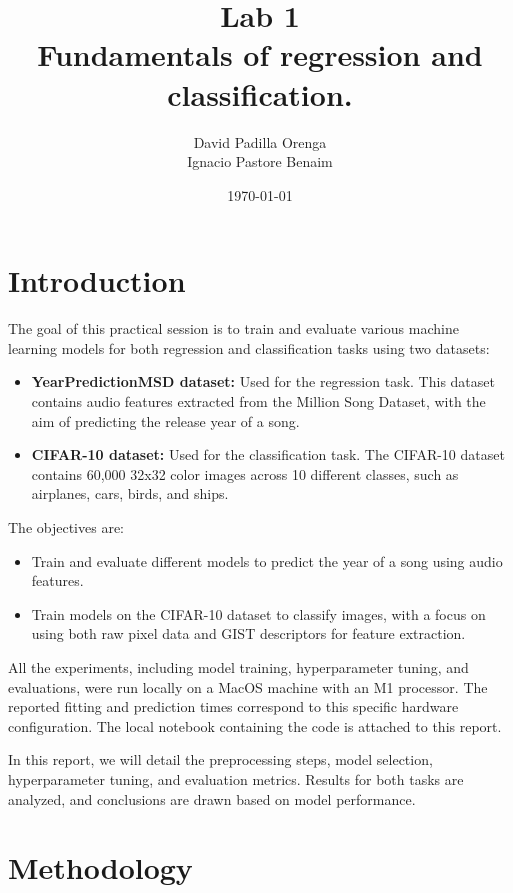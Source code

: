 \documentclass[twocolumn]{article}
\title{Lab 1 \\ \small Fundamentals of regression and classiﬁcation.}
\author{David Padilla Orenga\\ Ignacio Pastore Benaim}
\date{\today}   %
\begin{document}
\maketitle

\section{Introduction}

The goal of this practical session is to train and evaluate various machine learning models for both regression and classification tasks using two datasets:

\begin{itemize}
    \item \textbf{YearPredictionMSD dataset:} Used for the regression task.
     This dataset contains audio features extracted from the Million Song Dataset,
      with the aim of predicting the release year of a song.
    \item \textbf{CIFAR-10 dataset:} Used for the classification task. The CIFAR-10 dataset contains 60,000 32x32 color images across 10 different classes, such as airplanes, cars, birds, and ships.
    \end{itemize}

The objectives are:
\begin{itemize}
    \item Train and evaluate different models to predict the year of a song using audio features.
    \item Train models on the CIFAR-10 dataset to classify images, 
    with a focus on using both raw pixel data and GIST descriptors for feature extraction.
    \end{itemize}

All the experiments, including model training, hyperparameter tuning,
and evaluations, were run locally on a MacOS machine with an M1 processor. 
The reported fitting and prediction times correspond to 
this specific hardware configuration. The local notebook containing the code is attached to this report.


In this report, we will detail the preprocessing steps, model selection, 
hyperparameter tuning, and evaluation metrics. Results for both tasks are analyzed, 
and conclusions are drawn based on model performance.
 
\section{Methodology}
\end{document}
